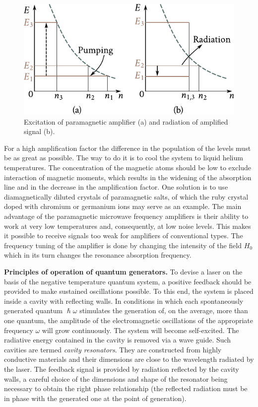 \begin{figure}[t]
	\begin{center}
		\includegraphics[scale=1]{figures/ch_07/fig_7_28.pdf}
		\caption[]{Excitation of paramagnetic amplifier (a) and radiation of amplified signal (b).}
		\label{fig:7_28}
	\end{center}
	\vspace{-0.8cm}
\end{figure}

For a high amplification factor the difference in the population of the levels must be as great as possible. The way to do it is to cool the system to liquid helium temperatures. The concentration of the
magnetic atoms should be low to exclude interaction of magnetic moments, which results in the widening of the absorption line and in the decrease in the amplification factor. One solution is to use diamagnetically diluted crystals of paramagnetic salts, of which the ruby crystal doped with chromium or germanium ions may serve as an example.
The main advantage of the paramagnetic microwave frequency amplifiers is their ability to work at very low temperatures and, consequently, at low noise levels. This makes it possible to receive signals too weak for amplifiers of conventional types. The frequency tuning of the amplifier is done by changing the intensity of the field $H_0$ which in its turn changes the resonance absorption frequency.

\textbf{Principles of operation of quantum generators.} To devise a laser on the basis of the negative temperature quantum system, a positive feedback should be provided to make sustained oscillations possible. To this end, the system is placed inside a cavity with reflecting walls. In conditions in which each spontaneously generated quantum $\hslash\omega$ stimulates the generation of, on the average, more than one quantum, the amplitude of the electromagnetic oscillations of the appropriate frequency $\omega$ will grow continuously. The system will become self-excited.
The radiative energy contained in the cavity is removed via a wave guide. Such cavities are termed \textit{cavity resonators}. They are constructed from highly conductive materials and their dimensions are close to the wavelength radiated by the laser. The feedback signal is provided by radiation reflected by the cavity walls, a careful choice of the dimensions and shape of the resonator being necessary to obtain the right phase relationship (the reflected radiation must be in phase with the generated one at the point of generation).

